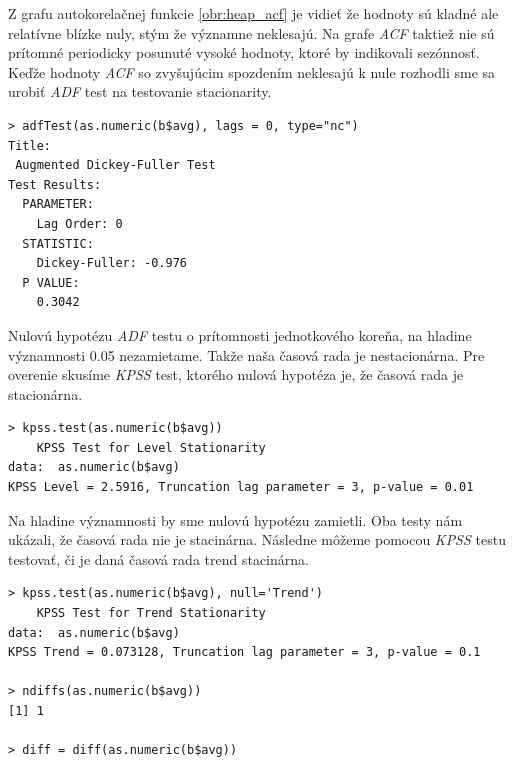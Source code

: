 \documentclass[12pt,a4paper,oneside,final]{article}
\theoremstyle{definition}
\theoremstyle{remark}
\numberwithin{equation}{section}
\begin{document}
Z grafu autokorelačnej funkcie \ref{obr:heap_acf} je vidieť že hodnoty sú kladné ale relatívne blízke
nuly, stým že významne neklesajú. 
Na grafe \emph{ACF} taktiež nie sú prítomné periodicky posunuté vysoké hodnoty, 
ktoré by indikovali sezónnosť.
Keďže hodnoty \emph{ACF} so zvyšujúcim spozdením neklesajú k nule rozhodli sme sa urobiť
\emph{ADF} test na testovanie stacionarity.

\begin{minipage}{\linewidth}
\begingroup
\fontsize{9pt}{7pt}\selectfont 
\begin{verbatim}
> adfTest(as.numeric(b$avg), lags = 0, type="nc")
Title:
 Augmented Dickey-Fuller Test
Test Results:
  PARAMETER:
    Lag Order: 0
  STATISTIC:
    Dickey-Fuller: -0.976
  P VALUE:
    0.3042 
\end{verbatim}
\endgroup
\end{minipage}

Nulovú hypotézu \emph{ADF} testu o prítomnosti jednotkového koreňa, na hladine významnosti 0.05
nezamietame. Takže naša časová rada je nestacionárna. Pre overenie skusíme \emph{KPSS} test,
ktorého nulová hypotéza je, že časová rada je stacionárna.

\begin{minipage}{\linewidth}
\begingroup
\fontsize{9pt}{7pt}\selectfont
\begin{verbatim}
> kpss.test(as.numeric(b$avg))
	KPSS Test for Level Stationarity
data:  as.numeric(b$avg)
KPSS Level = 2.5916, Truncation lag parameter = 3, p-value = 0.01
\end{verbatim}
\endgroup
\end{minipage}

Na hladine významnosti by sme nulovú hypotézu zamietli. Oba testy nám ukázali, že časová
rada nie je stacinárna. 
Následne môžeme pomocou \emph{KPSS} testu testovať, či je daná časová rada trend stacinárna.

\begin{minipage}{\linewidth}
\begingroup
\fontsize{9pt}{7pt}\selectfont
\begin{verbatim}
> kpss.test(as.numeric(b$avg), null='Trend')
	KPSS Test for Trend Stationarity
data:  as.numeric(b$avg)
KPSS Trend = 0.073128, Truncation lag parameter = 3, p-value = 0.1

> ndiffs(as.numeric(b$avg))
[1] 1

> diff = diff(as.numeric(b$avg))
\end{verbatim}
\endgroup
\end{minipage}
\end{document}
